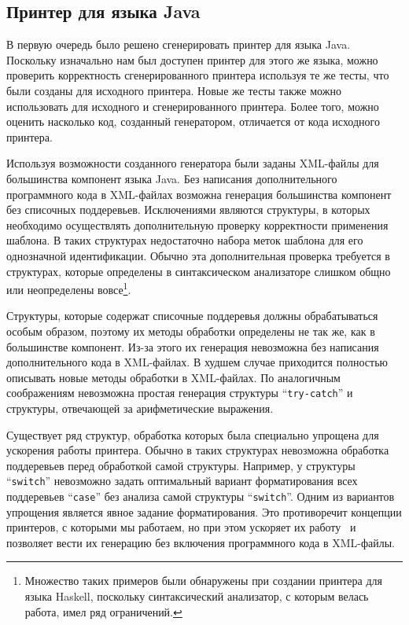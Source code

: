 \subsection{Принтер для языка Java}
В первую очередь было решено сгенерировать принтер для языка Java. Поскольку изначально нам был доступен принтер для этого же языка, можно проверить корректность сгенерированного принтера используя те же тесты, что были созданы для исходного принтера. Новые же тесты также можно использовать для исходного и сгенерированного принтера. Более того, можно оценить насколько код, созданный генератором, отличается от кода исходного принтера.

Используя возможности созданного генератора были заданы XML-файлы для большинства компонент языка Java. Без написания дополнительного программного кода в XML-файлах возможна генерация большинства компонент без списочных поддеревьев. Исключениями являются структуры, в которых необходимо осуществлять дополнительную проверку корректности применения шаблона. В таких структурах недостаточно набора меток шаблона для его однозначной идентификации. Обычно эта дополнительная проверка требуется в структурах, которые определены в синтаксическом анализаторе слишком общно или неопределены вовсе\footnote{Множество таких примеров были обнаружены при создании принтера для языка Haskell, поскольку синтаксический анализатор, с которым велась работа, имел ряд ограничений.}.

Структуры, которые содержат списочные поддеревья должны обрабатываться особым образом, поэтому их методы обработки определены не так же, как в большинстве компонент. Из-за этого их генерация невозможна без написания дополнительного кода в XML-файлах. В худшем случае приходится полностью описывать новые методы обработки в XML-файлах. По аналогичным соображениям невозможна простая генерация структуры ``\lstinline{try-catch}'' и структуры, отвечающей за арифметические выражения.

Существует ряд структур, обработка которых была специально упрощена для ускорения работы принтера. Обычно в таких структурах невозможна обработка поддеревьев перед обработкой самой структуры. Например, у структуры ``\lstinline{switch}'' невозможно задать оптимальный вариант форматирования всех поддеревьев ``\lstinline{case}'' без анализа самой структуры ``\lstinline{switch}''. Одним из вариантов упрощения является явное задание форматирования. Это противоречит концепции принтеров, с которыми мы работаем, но при этом ускоряет их работу~\cite{podkopaev:diploma} и позволяет вести их генерацию без включения программного кода в XML-файлы.

